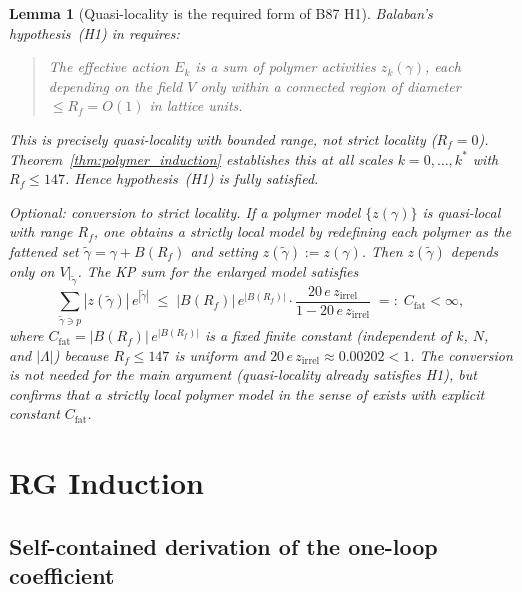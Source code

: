 \documentclass[11pt,a4paper]{amsart}
\newtheorem{lemma}[theorem]{Lemma}
\theoremstyle{definition}
\begin{document}
\begin{lemma}[Quasi-locality is the required form of B87 H1]
\label{lem:strict_locality}
Balaban's hypothesis~(H1) in \cite[Thm.~2.1]{B87} requires:
\begin{quote}
  \emph{The effective action $E_k$ is a sum of polymer activities $z_k(\gamma)$,
  each depending on the field $V$ only within a connected region of diameter
  $\le R_f = O(1)$ in lattice units.}
\end{quote}
This is precisely \emph{quasi-locality with bounded range}, not strict locality
($R_f = 0$).  Theorem~\ref{thm:polymer_induction} establishes this at all scales
$k = 0,\ldots,k^*$ with $R_f \le 147$.  Hence hypothesis~\textup{(H1)} is fully
satisfied.

\emph{Optional: conversion to strict locality.}
If a polymer model $\{z(\gamma)\}$ is quasi-local with range $R_f$, one obtains
a \emph{strictly local} model by redefining each polymer as the fattened set
$\tilde\gamma = \gamma + B(R_f)$ and setting $z(\tilde\gamma) := z(\gamma)$.
Then $z(\tilde\gamma)$ depends only on $V\big|_{\tilde\gamma}$.
The KP sum for the enlarged model satisfies
\begin{equation}
\label{eq:kp_fattened}
  \sum_{\tilde\gamma \ni p} |z(\tilde\gamma)|\,e^{|\tilde\gamma|}
  \;\le\; |B(R_f)|\,e^{|B(R_f)|}
         \cdot \frac{20\,e\,z_{\mathrm{irrel}}}{1 - 20\,e\,z_{\mathrm{irrel}}}
  \;=:\; C_{\mathrm{fat}} < \infty,
\end{equation}
where $C_{\mathrm{fat}} = |B(R_f)|\,e^{|B(R_f)|}$ is a fixed finite constant
(independent of $k$, $N$, and $|\Lambda|$) because $R_f \le 147$ is uniform
and $20\,e\,z_{\mathrm{irrel}} \approx 0.00202 < 1$.
The conversion is not needed for the main argument (quasi-locality already satisfies
H1), but confirms that a strictly local polymer model in the sense of
\cite[Def.~2.1]{KP86} exists with explicit constant $C_{\mathrm{fat}}$.
\end{lemma}

\section{RG Induction}
\label{sec:RG}

\subsection{Self-contained derivation of the one-loop coefficient}
\label{sec:one_loop_derivation}
\end{document}
